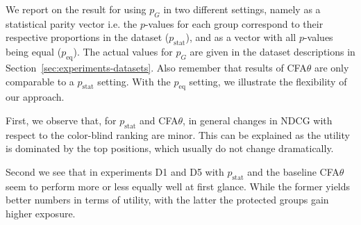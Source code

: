 %
We report on the result for \algoFAIR using $p_G$ in two different settings, namely as a statistical parity vector i.e. the $p$-values for each group correspond to their respective proportions in the dataset ($p_{\text{stat}}$), and as a vector with all $p$-values being equal ($p_{\text{eq}}$).
%
The actual values for $p_G$ are given in the dataset descriptions in Section~\ref{sec:experiments-datasets}.
%
Also remember that results of CFA$\theta$ are only comparable to a \algoFAIR $p_{\text{stat}}$ setting.
%
With the $p_{\text{eq}}$ setting, we illustrate the flexibility of our approach.

First, we observe that, for \algoFAIR $p_{\text{stat}}$ and CFA$\theta$, in general changes in NDCG with respect to the color-blind ranking are minor.
%
This can be explained as the utility is dominated by the top positions, which usually do not change dramatically.

Second we see that in experiments D1 and D5 \algoFAIR with $p_{\text{stat}}$ and the baseline CFA$\theta$ seem to perform more or less equally well at first glance.
%
While the former yields better numbers in terms of utility, with the latter the protected groups gain higher exposure.

